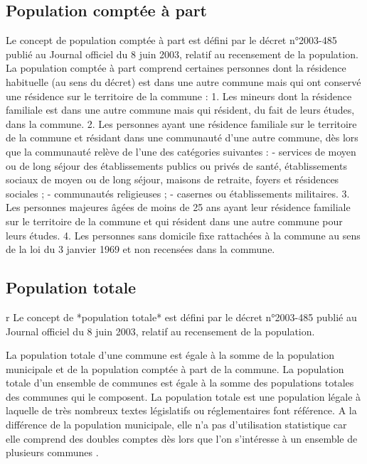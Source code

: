 \documentclass[12pt,english,french,twoside]{report}\usepackage[]{graphicx}\usepackage[]{color}
\begin{document}
\subsection*{Population comptée à part}
Le concept de population comptée à part est défini par le décret n°2003-485 publié au Journal officiel du 8 juin 2003, relatif au recensement de la population.
La population comptée à part comprend certaines personnes dont la résidence habituelle (au sens du décret) est dans une autre commune mais qui ont conservé une résidence sur le territoire de la commune :
1. Les mineurs dont la résidence familiale est dans une autre commune mais qui résident, du fait de leurs études, dans la commune.
2. Les personnes ayant une résidence familiale sur le territoire de la commune et résidant dans une communauté d'une autre commune, dès lors que la communauté relève de l'une des catégories suivantes :
- services de moyen ou de long séjour des établissements publics ou privés de santé, établissements sociaux de moyen ou de long séjour, maisons de retraite, foyers et résidences sociales ;
- communautés religieuses ;
- casernes ou établissements militaires.
3. Les personnes majeures âgées de moins de 25 ans ayant leur résidence familiale sur le territoire de la commune et qui résident dans une autre commune pour leurs études.
4. Les personnes sans domicile fixe rattachées à la commune au sens de la loi du 3 janvier 1969 et non recensées dans la commune. \cite{8}


\subsection*{Population totale}
r
Le concept de *population totale* est défini par le décret n°2003-485 publié au Journal officiel du 8 juin 2003, relatif au recensement de la population.

La population totale d'une commune est égale à la somme de la population municipale et de la population comptée à part de la commune.
La population totale d'un ensemble de communes est égale à la somme des populations totales des communes qui le composent.
La population totale est une population légale à laquelle de très nombreux textes législatifs ou réglementaires font référence. A la différence de la population municipale, elle n'a pas d'utilisation statistique car elle comprend des doubles comptes dès lors que l'on s'intéresse à un ensemble de plusieurs communes \cite{7}.
\end{document}
